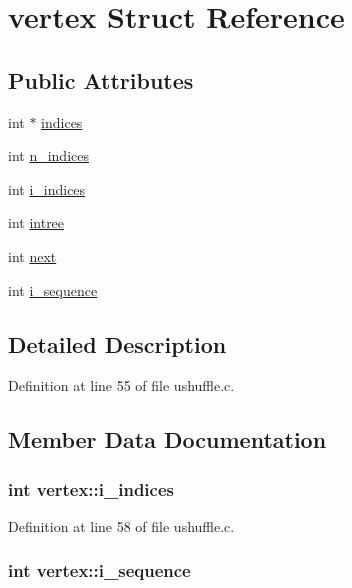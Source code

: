 \hypertarget{structvertex}{\section{vertex Struct Reference}
\label{structvertex}
}
\subsection*{Public Attributes}
\begin{DoxyCompactItemize}
\item 
int $\ast$ \hyperlink{structvertex_a583999f36a31b761343555543e2eefce}{indices}
\item 
int \hyperlink{structvertex_a296df49f6cab00157977d610f7dbae5b}{n\+\_\+indices}
\item 
int \hyperlink{structvertex_a7428afcc864f983bc3f0542657362f30}{i\+\_\+indices}
\item 
int \hyperlink{structvertex_ade015e1a35c3260e139ff7b4e5d4933d}{intree}
\item 
int \hyperlink{structvertex_ac67d53f1ccda0ec85b4870127b6928ad}{next}
\item 
int \hyperlink{structvertex_a1d2a65f07fe0575909c18bf445a7a4c1}{i\+\_\+sequence}
\end{DoxyCompactItemize}


\subsection{Detailed Description}


Definition at line 55 of file ushuffle.\+c.



\subsection{Member Data Documentation}
\hypertarget{structvertex_a7428afcc864f983bc3f0542657362f30}{
\subsubsection[{i\+\_\+indices}]{\setlength{\rightskip}{0pt plus 5cm}int vertex\+::i\+\_\+indices}}\label{structvertex_a7428afcc864f983bc3f0542657362f30}


Definition at line 58 of file ushuffle.\+c.

\hypertarget{structvertex_a1d2a65f07fe0575909c18bf445a7a4c1}{
\subsubsection[{i\+\_\+sequence}]{\setlength{\rightskip}{0pt plus 5cm}int vertex\+::i\+\_\+sequence}}\label{structvertex_a1d2a65f07fe0575909c18bf445a7a4c1}


